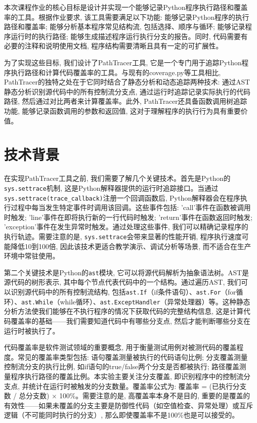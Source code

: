 本次课程作业的核心目标是设计并实现一个能够记录Python程序执行路径和覆盖率的工具。根据作业要求, 该工具需要满足以下功能: 能够记录Python程序的执行路径和覆盖率; 能够分析基本程序常见结构流, 包括选择、顺序与循环; 能够记录程序运行时的执行路径; 能够生成描述程序运行执行分支的报告。同时, 代码需要有必要的注释和说明使用文档, 程序结构需要清晰且具有一定的可扩展性。

为了实现这些目标, 我们设计了PathTracer工具, 它是一个专门用于追踪Python程序执行路径和计算代码覆盖率的工具。与现有的coverage.py等工具相比, PathTracer的独特之处在于它同时结合了静态分析和动态追踪两种技术: 通过AST静态分析识别源代码中的所有控制流分支点, 通过运行时追踪记录实际执行的代码路径, 然后通过对比两者来计算覆盖率。此外, PathTracer还具备函数调用树追踪功能, 能够记录函数调用的参数和返回值, 这对于理解程序的执行行为具有重要价值。

\section{技术背景}

在实现PathTracer工具之前, 我们需要了解几个关键技术。首先是Python的\texttt{sys.settrace}机制, 这是Python解释器提供的运行时追踪接口。当通过\texttt{sys.settrace(trace\_callback)}注册一个回调函数后, Python解释器会在程序执行过程中每当发生特定事件时调用该回调。这些事件包括: 'call'事件在函数被调用时触发; 'line'事件在即将执行新的一行代码时触发; 'return'事件在函数返回时触发; 'exception'事件在发生异常时触发。通过处理这些事件, 我们可以精确记录程序的执行轨迹。需要注意的是, \texttt{sys.settrace}会带来显著的性能开销, 程序执行速度可能降低10到100倍, 因此该技术更适合教学演示、调试分析等场景, 而不适合在生产环境中常驻使用。

第二个关键技术是Python的\texttt{ast}模块, 它可以将源代码解析为抽象语法树。AST是源代码的树形表示, 其中每个节点代表代码中的一个结构。通过遍历AST, 我们可以识别源代码中的所有控制流结构, 包括\texttt{ast.If}（if条件语句）、\texttt{ast.For}（for循环）、\texttt{ast.While}（while循环）、\texttt{ast.ExceptHandler}（异常处理器）等。这种静态分析方法使我们能够在不执行程序的情况下获取代码的完整结构信息, 这是计算代码覆盖率的基础——我们需要知道代码中有哪些分支点, 然后才能判断哪些分支在运行时被执行了。

代码覆盖率是软件测试领域的重要概念, 用于衡量测试用例对被测代码的覆盖程度。常见的覆盖率类型包括: 语句覆盖测量被执行的代码语句比例; 分支覆盖测量控制流分支的执行比例, 如if语句的true/false两个分支是否都被执行; 路径覆盖测量程序执行路径的覆盖比例。本实验主要关注分支覆盖, 即识别程序中的控制流分支点, 并统计在运行时被触发的分支数量。覆盖率公式为: 覆盖率 = (已执行分支数 / 总分支数) × 100\%。需要注意的是, 高覆盖率本身不是目的, 重要的是覆盖的有效性——如果未覆盖的分支主要是防御性代码（如空值检查、异常处理）或互斥逻辑（不可能同时执行的分支）, 那么即使覆盖率不是100\%也是可以接受的。
